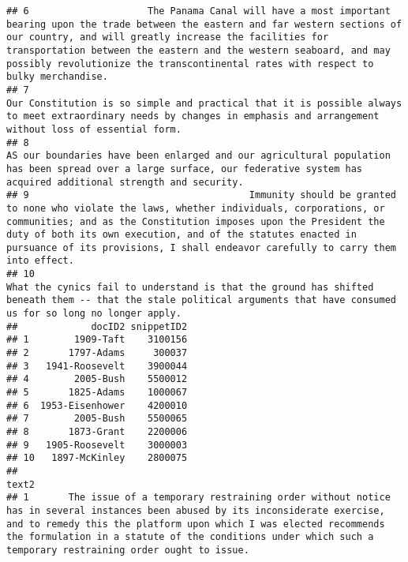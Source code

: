 \documentclass[]{article}
\begin{document}
\begin{verbatim}
## 6                     The Panama Canal will have a most important bearing upon the trade between the eastern and far western sections of our country, and will greatly increase the facilities for transportation between the eastern and the western seaboard, and may possibly revolutionize the transcontinental rates with respect to bulky merchandise.
## 7                                                                                                                                                                                  Our Constitution is so simple and practical that it is possible always to meet extraordinary needs by changes in emphasis and arrangement without loss of essential form.
## 8                                                                                                                                                                            AS our boundaries have been enlarged and our agricultural population has been spread over a large surface, our federative system has acquired additional strength and security.
## 9                                       Immunity should be granted to none who violate the laws, whether individuals, corporations, or communities; and as the Constitution imposes upon the President the duty of both its own execution, and of the statutes enacted in pursuance of its provisions, I shall endeavor carefully to carry them into effect.
## 10                                                                                                                                                                                   What the cynics fail to understand is that the ground has shifted beneath them -- that the stale political arguments that have consumed us for so long no longer apply.
##             docID2 snippetID2
## 1        1909-Taft    3100156
## 2       1797-Adams     300037
## 3   1941-Roosevelt    3900044
## 4        2005-Bush    5500012
## 5       1825-Adams    1000067
## 6  1953-Eisenhower    4200010
## 7        2005-Bush    5500065
## 8       1873-Grant    2200006
## 9   1905-Roosevelt    3000003
## 10   1897-McKinley    2800075
##                                                                                                                                                                                                                                                                                                                   text2
## 1       The issue of a temporary restraining order without notice has in several instances been abused by its inconsiderate exercise, and to remedy this the platform upon which I was elected recommends the formulation in a statute of the conditions under which such a temporary restraining order ought to issue.

\end{verbatim}
\end{document}
